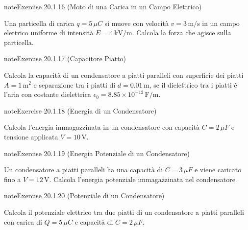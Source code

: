 \documentclass[letterpaper,10pt,italian]{jupyterBook}
\begin{document}
\begin{sphinxadmonition}{note}{Exercise 20.1.16 (Moto di una Carica in un Campo Elettrico)}



\sphinxAtStartPar
Una particella di carica \(q = 5 \, \mu C\) si muove con velocità \(v = 3 \, \text{m/s}\) in un campo elettrico uniforme di intensità \(E = 4 \, \text{kV/m}\). Calcola la forza che agisce sulla particella.
\end{sphinxadmonition}
 \label{exercise:ch/electromagnetism/electrostatics-problems-exercise-16}

\begin{sphinxadmonition}{note}{Exercise 20.1.17 (Capacitore Piatto)}



\sphinxAtStartPar
Calcola la capacità di un condensatore a piatti paralleli con superficie dei piatti \(A = 1 \, \text{m}^2\) e separazione tra i piatti di \(d = 0.01 \, \text{m}\), se il dielettrico tra i piatti è l’aria con costante dielettrica \(\epsilon_0 = 8.85 \times 10^{-12} \, \text{F/m}\).
\end{sphinxadmonition}
 \label{exercise:ch/electromagnetism/electrostatics-problems-exercise-17}

\begin{sphinxadmonition}{note}{Exercise 20.1.18 (Energia di un Condensatore)}



\sphinxAtStartPar
Calcola l’energia immagazzinata in un condensatore con capacità \(C = 2 \, \mu F\) e tensione applicata \(V = 10 \, \text{V}\).
\end{sphinxadmonition}
 \label{exercise:ch/electromagnetism/electrostatics-problems-exercise-18}

\begin{sphinxadmonition}{note}{Exercise 20.1.19 (Energia Potenziale di un Condensatore)}



\sphinxAtStartPar
Un condensatore a piatti paralleli ha una capacità di \(C = 3 \, \mu F\) e viene caricato fino a \(V = 12 \, \text{V}\). Calcola l’energia potenziale immagazzinata nel condensatore.
\end{sphinxadmonition}
 \label{exercise:ch/electromagnetism/electrostatics-problems-exercise-19}

\begin{sphinxadmonition}{note}{Exercise 20.1.20 (Potenziale di un Condensatore)}



\sphinxAtStartPar
Calcola il potenziale elettrico tra due piatti di un condensatore a piatti paralleli con carica di \(Q = 5 \, \mu C\) e capacità di \(C = 2 \, \mu F\).
\end{sphinxadmonition}
 \label{exercise:ch/electromagnetism/electrostatics-problems-exercise-20}
\end{document}
